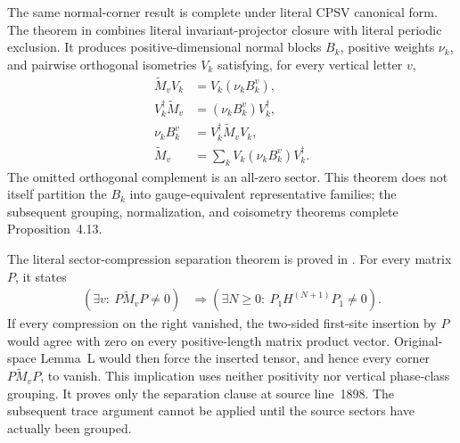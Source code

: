 \documentclass{article}
\begin{document}
The same normal-corner result is complete under literal CPSV canonical form.
The theorem
in  combines literal
invariant-projector closure with literal periodic exclusion. It produces
positive-dimensional normal blocks $B_k$, positive weights $\nu_k$, and
pairwise orthogonal isometries $V_k$ satisfying, for every vertical letter
$v$,
\begin{align}
    \widetilde M_vV_k
     & =V_k(\nu_kB_k^v),
    \label{eq:cpgsv17_vertical_cf_grouping_literal_right_intertwining} \\
    V_k^\dagger\widetilde M_v
     & =(\nu_kB_k^v)V_k^\dagger,
    \label{eq:cpgsv17_vertical_cf_grouping_literal_left_intertwining}  \\
    \nu_kB_k^v
     & =V_k^\dagger\widetilde M_vV_k,
    \label{eq:cpgsv17_vertical_cf_grouping_literal_compression}        \\
    \widetilde M_v
     & =\sum_kV_k(\nu_kB_k^v)V_k^\dagger.
    \label{eq:cpgsv17_vertical_cf_grouping_literal_reconstruction}
\end{align}
The omitted orthogonal complement is an all-zero sector. This theorem does not
itself partition the $B_k$ into gauge-equivalent representative families; the
subsequent grouping, normalization, and coisometry theorems complete
Proposition~4.13.

The literal sector-compression separation theorem
is proved in . For every matrix
$P$, it states
\begin{align}
    \left(\exists v:\ P\widetilde M_vP\ne0\right)
     & \Longrightarrow
    \left(\exists N\geq0:\
    P_1H^{(N+1)}P_1\ne0\right).
    \label{eq:cpgsv17_vertical_cf_grouping_sector_compression_separation}
\end{align}
If every compression on the right vanished, the two-sided first-site insertion
by $P$ would agree with zero on every positive-length matrix product vector.
Original-space Lemma~L would then force the inserted tensor, and hence every
corner $P\widetilde M_vP$, to vanish. This implication uses neither positivity
nor vertical phase-class grouping. It proves only the separation clause at
source line~1898. The subsequent trace argument cannot be applied until the
source sectors have actually been grouped.
\end{document}
